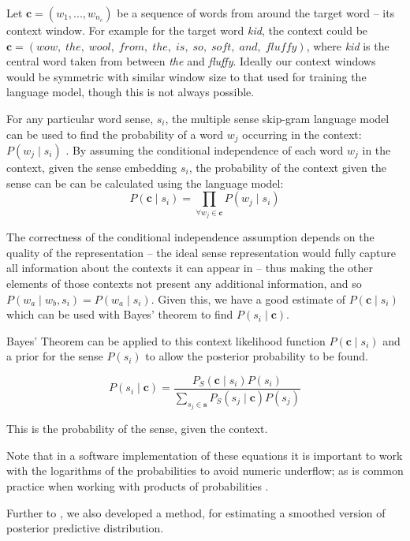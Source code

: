 \documentclass{sig-alternate}
\renewcommand{\c}{\mathbf{c}}
\newcommand{\s}{\mathbf{s}}
\begin{document}
Let $\c=(w_{1},...,w_{n_c})$ be a sequence of words from around the target word -- its context window.
For example for the target word \emph{kid}, the context could be $\c=(wow,\; the,\; wool,\; from,\; the,\; is,\; so,\; soft,\; and,\; fluffy)$, where \emph{kid} is the central word taken from between \emph{the} and \emph{fluffy}.
Ideally our context windows would be symmetric with similar window size to that used for training the language model, though this is not always possible.

For any particular word sense, $s_i$, the multiple sense skip-gram language model can be used to
find the probability of a word $w_j$ occurring in the context: $P(w_j \mid s_i)$
\parencite{tian2014probabilistic,AdaGrams}.
By assuming the conditional independence of each word $w_j$ in the context, given the sense embedding $s_i$, the probability of the context given the sense can be can be calculated using the language model:
\begin{equation} \label{eq:contextprobtrue}
P(\c \mid s_{i})=\prod_{\forall w_{j}\in\c}P(w_{j} \mid s_{i})
\end{equation}

The correctness of the conditional independence assumption depends on the quality of the representation -- the ideal sense representation would fully capture all information about the contexts it can appear in -- thus making the other elements of those contexts not present any additional information, and so  $P(w_a \mid w_b,s_i)=P(w_a \mid s_i)$. Given this, we have a good estimate of $P(\c \mid s_{i})$ which can be used with Bayes' theorem to find $P( s_i \mid \c)$.


Bayes' Theorem can be applied to this context likelihood function  $P(\c \mid s_{i})$ and a prior for the sense $P(s_i)$ to allow the posterior probability to be found.

\begin{equation} \label{eq:generalwsd}
P(s_{i} \mid \c) =
\dfrac{P_S(\c \mid s_{i})P(s_{i})}
{\sum_{s_{j}\in\s} P_S(s_{j} \mid \c)P(s_{j})}
\end{equation}

This is the probability of the sense, given the context.

Note that in a software implementation of these equations it is important to work with the logarithms of the probabilities to avoid numeric underflow; as is common practice when working with products of probabilities \parencite{press2007numerical}.

Further to , we also developed a method, for estimating a smoothed version of posterior predictive distribution.
\end{document}
